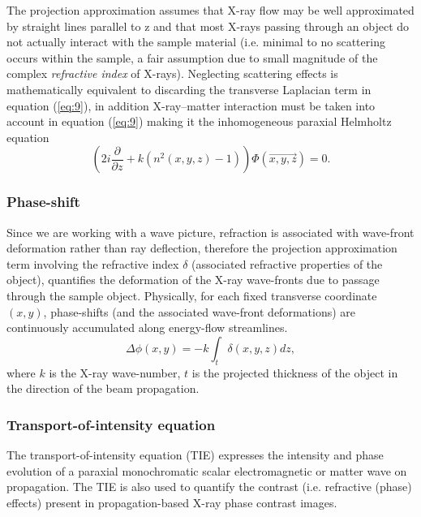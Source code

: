 \documentclass[9pt, a4paper]{article}
\begin{document}
The projection approximation assumes that X-ray flow may be well approximated by straight lines parallel to z\cite{PagsTutes} and that most X-rays passing through an object do not actually interact with the sample material (i.e. minimal to no scattering occurs within the sample, a fair assumption due to small magnitude of the complex \textit{refractive index} of X-rays). Neglecting scattering effects is mathematically equivalent to discarding the transverse Laplacian term in equation (\ref{eq:9})\cite{CH49}, in addition X-ray--matter interaction must be taken into account in equation (\ref{eq:9}) making it the inhomogeneous paraxial Helmholtz equation
\begin{equation}\label{eq:13}
\left ( 2 i \frac{\partial }{\partial z} + k ( n^2 (x, y, z) - 1 )\right ) \Phi(\vec{x , y, z}) = 0.
\end{equation}

\subsubsection{Phase-shift}
Since we are working with a wave picture, refraction is associated with wave-front deformation rather than ray deflection, therefore the projection approximation term involving the refractive index $\delta$ (associated refractive properties of the object), quantifies the deformation of the X-ray wave-fronts due to passage through the sample object. Physically, for each fixed transverse coordinate $(x, y)$, phase-shifts (and the associated wave-front deformations) are continuously accumulated along energy-flow streamlines\cite{PagsTutes}.
\begin{equation}\label{eq:14}
\Delta \phi(x, y) = -k \int_{t}\delta(x, y, z)dz,
\end{equation}
where $k$ is the X-ray wave-number, $t$ is the projected thickness of the object in the direction of the beam propagation.

\subsubsection{Transport-of-intensity equation}
The transport-of-intensity equation (TIE) expresses the intensity and phase evolution of a paraxial monochromatic scalar electromagnetic or matter wave on propagation\cite{Pags2002}. The TIE is also used to quantify the contrast (i.e. refractive (phase) effects) present in propagation-based X-ray phase contrast images\cite{PagsTutes}.
\end{document}
